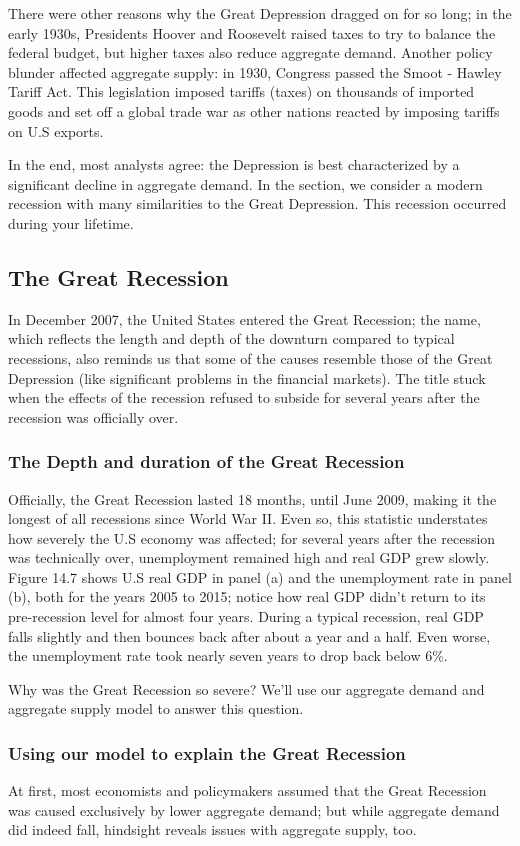 \documentclass[11pt]{article} %
\begin{document}
There were other reasons why the Great Depression dragged on for so long; in the early 1930s, Presidents Hoover and Roosevelt raised taxes to try to balance the federal budget, but higher taxes also reduce aggregate demand. Another policy blunder affected aggregate supply: in 1930, Congress passed the Smoot - Hawley Tariff Act. This legislation imposed tariffs (taxes) on thousands of imported goods and set off a global trade war as other nations reacted by imposing tariffs on U.S exports.

In the end, most analysts agree: the Depression is best characterized by a significant decline in aggregate demand. In the section, we consider a modern recession with many similarities to the Great Depression. This recession occurred during your lifetime.

\subsection*{The Great Recession}
In December 2007, the United States entered the Great Recession; the name, which reflects the length and depth of the downturn compared to typical recessions, also reminds us that some of the causes resemble those of the Great Depression (like significant problems in the financial markets). The title stuck when the effects of the recession refused to subside for several years after the recession was officially over.

\subsubsection*{The Depth and duration of the Great Recession}
Officially, the Great Recession lasted 18 months, until June 2009, making it the longest of all recessions since World War II. Even so, this statistic understates how severely the U.S economy was affected; for several years after the recession was technically over, unemployment remained high and real GDP grew slowly. Figure 14.7 shows U.S real GDP in panel (a) and the unemployment rate in panel (b), both for the years 2005 to 2015; notice how real GDP didn't return to its pre-recession level for almost four years. During a typical recession, real GDP falls slightly and then bounces back after about a year and a half. Even worse, the unemployment rate took nearly seven years to drop back below 6\%.

Why was the Great Recession so severe? We'll use our aggregate demand and aggregate supply model to answer this question.
\subsubsection*{Using our model to explain the Great Recession}
At first, most economists and policymakers assumed that the Great Recession was caused exclusively by lower aggregate demand; but while aggregate demand did indeed fall, hindsight reveals issues with aggregate supply, too.
\end{document}
